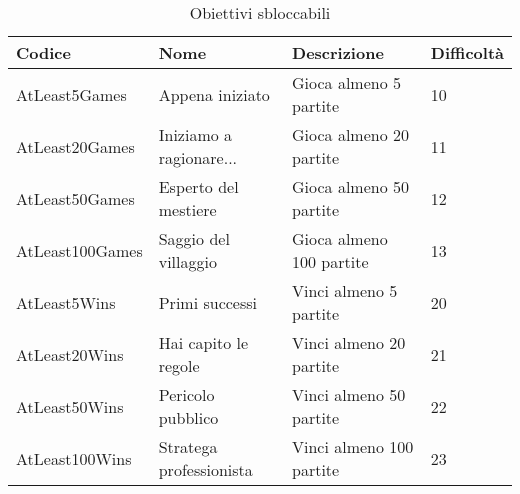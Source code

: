\begin{table}
	\centering
	\begin{tabular}{|L{3cm}|L{4cm}|L{5.6cm}|C{1.7cm}|}
		\hline
		\textbf{Codice} & \textbf{Nome} & \textbf{Descrizione} & \textbf{Difficoltà} \\
		\hline
		AtLeast5Games & Appena iniziato & Gioca almeno 5 partite & 10 \\
		AtLeast20Games & Iniziamo a ragionare... & Gioca almeno 20 partite & 11 \\
		AtLeast50Games & Esperto del mestiere & Gioca almeno 50 partite & 12 \\
		AtLeast100Games & Saggio del villaggio & Gioca almeno 100 partite & 13 \\
		
		AtLeast5Wins & Primi successi & Vinci almeno 5 partite & 20 \\
		AtLeast20Wins & Hai capito le regole & Vinci almeno 20 partite & 21 \\
		AtLeast50Wins & Pericolo pubblico & Vinci almeno 50 partite & 22 \\
		AtLeast100Wins & Stratega professionista & Vinci almeno 100 partite & 23 \\
		\hline
	\end{tabular}
	\caption{Obiettivi sbloccabili}
	\label{tab:obiettivi}
\end{table}
